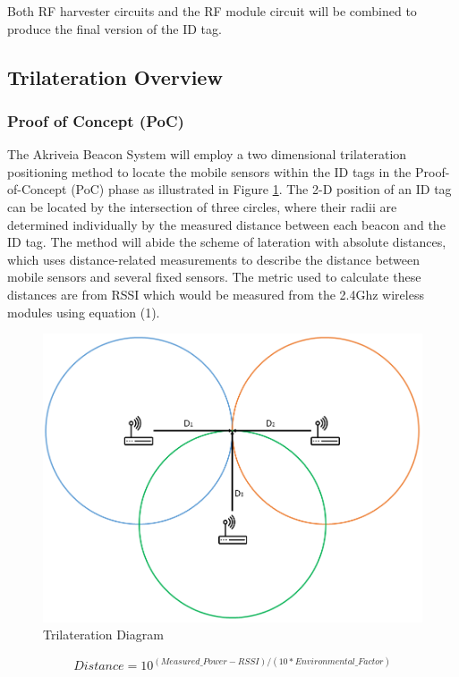 \bigskip
Both RF harvester circuits and the RF module circuit will be combined to produce the final version of the ID tag.

\break
\subsection{Trilateration Overview}
\bigskip
\subsubsection{Proof of Concept (PoC)}
The Akriveia Beacon System will employ a two dimensional trilateration positioning method to locate the mobile sensors within the ID tags in the Proof-of-Concept (PoC) phase as illustrated in Figure \ref{Tri}. The 2-D position of an ID tag can be located by the intersection of three circles, where their radii are determined individually by the measured distance between each beacon and the ID tag. The method will abide the scheme of lateration with absolute distances, which uses distance-related measurements to describe the distance between mobile sensors and several fixed sensors. The metric used to calculate these distances are from RSSI which would be measured from the 2.4Ghz wireless modules using equation (1).
\medskip
\begin{figure}[h!]
    \centering
    \includegraphics[scale=0.40]{./images/Tri.png}
    \caption{Trilateration Diagram}
    \label{Tri}
\end{figure}

\begin{equation}
    Distance = 10^{(Measured\_Power - RSSI)/(10*Environmental\_Factor)}
\end{equation}

